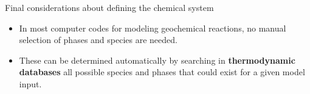 %
%
\begin{frame}[<+->]{Final considerations about defining the chemical system}
\begin{itemize}
\item In most computer codes for modeling geochemical reactions, no manual
selection of phases and species are needed. 
\item These can be determined automatically by searching in \textbf{thermodynamic
databases} all possible species and phases that could exist for a
given model input. 
\end{itemize}
\end{frame}
